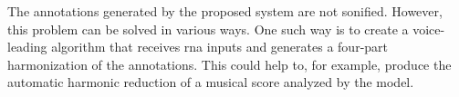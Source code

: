 
The annotations generated by the proposed system are not
sonified. However, this problem can be solved in various
ways. One such way is to create a voice-leading algorithm
that receives \gls{rna} inputs and generates a four-part
harmonization of the annotations. This could help to, for
example, produce the automatic harmonic reduction of a
musical score analyzed by the model.
